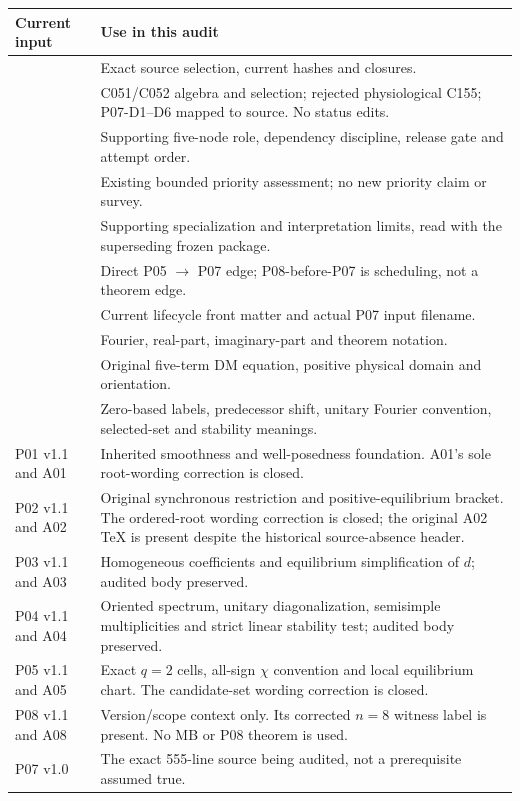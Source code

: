 \documentclass[11pt]{article}
\begin{document}
\begin{longtable}{@{}L{0.30\textwidth}L{0.65\textwidth}@{}}
\toprule Current input & Use in this audit\\\midrule\endhead
{} & Exact source selection, current hashes and closures.\\
 & C051/C052 algebra and selection; rejected physiological C155; P07-D1--D6 mapped to source. No status edits.\\
 & Supporting five-node role, dependency discipline, release gate and attempt order.\\
 & Existing bounded priority assessment; no new priority claim or survey.\\
 & Supporting specialization and interpretation limits, read with the superseding frozen package.\\
 & Direct P05 $\to$ P07 edge; P08-before-P07 is scheduling, not a theorem edge.\\
 & Current lifecycle front matter and actual P07 input filename.\\
 & Fourier, real-part, imaginary-part and theorem notation.\\
 & Original five-term DM equation, positive physical domain and orientation.\\
 & Zero-based labels, predecessor shift, unitary Fourier convention, selected-set and stability meanings.\\
P01 v1.1 and A01 & Inherited smoothness and well-posedness foundation. A01's sole root-wording correction is closed.\\
P02 v1.1 and A02 & Original synchronous restriction and positive-equilibrium bracket. The ordered-root wording correction is closed; the original A02 TeX is present despite the historical source-absence header.\\
P03 v1.1 and A03 & Homogeneous coefficients and equilibrium simplification of $d$; audited body preserved.\\
P04 v1.1 and A04 & Oriented spectrum, unitary diagonalization, semisimple multiplicities and strict linear stability test; audited body preserved.\\
P05 v1.1 and A05 & Exact $q=2$ cells, all-sign $\chi$ convention and local equilibrium chart. The candidate-set wording correction is closed.\\
P08 v1.1 and A08 & Version/scope context only. Its corrected $n=8$ witness label is present. No MB or P08 theorem is used.\\
P07 v1.0 & The exact 555-line source being audited, not a prerequisite assumed true.\\
\bottomrule
\end{longtable}
\end{document}
